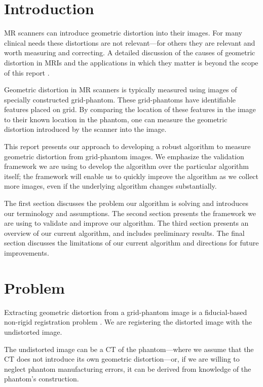 \documentclass[12pt]{article}
\begin{document}
\maketitle

\section{Introduction}
MR scanners can introduce geometric distortion into their images.  For many clinical needs these distortions are not relevant---for others they are relevant and worth measuring and correcting.  A detailed discussion of the causes of geometric distortion in MRIs and the applications in which they matter is beyond the scope of this report \cite{baldwin2007,torfeh2015,wang2005,mribook}.  

Geometric distortion in MR scanners is typically measured using images of specially constructed grid-phantom.  These grid-phantoms have identifiable features placed on grid.  By comparing the location of these features in the image to their known location in the phantom, one can measure the geometric distortion introduced by the scanner into the image.

This report presents our approach to developing a robust algorithm to measure geometric distortion from grid-phantom images.  We emphasize the validation framework we are using to develop the algorithm over the particular algorithm itself; the framework will enable us to quickly improve the algorithm as we collect more images, even if the underlying algorithm changes substantially.

The first section discusses the problem our algorithm is solving and introduces our terminology and assumptions.  The second section presents the framework we are using to validate and improve our algorithm.  The third section presents an overview of our current algorithm, and includes preliminary results.  The final section discusses the limitations of our current algorithm and directions for future improvements.

\section{Problem}
Extracting geometric distortion from a grid-phantom image is a fiducial-based non-rigid registration problem \cite{hill2001}.  We are registering the distorted image with the undistorted image.

The undistorted image can be a CT of the phantom---where we assume that the CT does not introduce its own geometric distortion---or, if we are willing to neglect phantom manufacturing errors, it can be derived from knowledge of the phantom's construction.
\end{document}

